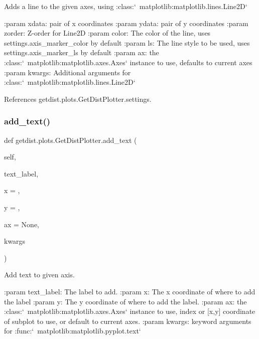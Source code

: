 \begin{DoxyVerb}Adds a line to the given axes, using :class:`~matplotlib:matplotlib.lines.Line2D`

:param xdata: pair of x coordinates
:param ydata: pair of y coordinates
:param zorder: Z-order for Line2D
:param color: The color of the line, uses settings.axis_marker_color by default
:param ls: The line style to be used, uses settings.axis_marker_ls by default
:param ax: the :class:`~matplotlib:matplotlib.axes.Axes` instance to use, defaults to current axes
:param kwargs:  Additional arguments for :class:`~matplotlib:matplotlib.lines.Line2D`
\end{DoxyVerb}
 

References getdist.\+plots.\+Get\+Dist\+Plotter.\+settings.

\mbox{\label{classgetdist_1_1plots_1_1GetDistPlotter_a3508bf76855c92e7e9129377b76ee390}} 
\subsubsection{\texorpdfstring{add\+\_\+text()}{add\_text()}}
{\footnotesize\ttfamily def getdist.\+plots.\+Get\+Dist\+Plotter.\+add\+\_\+text (\begin{DoxyParamCaption}\item[{}]{self,  }\item[{}]{text\+\_\+label,  }\item[{}]{x = {},  }\item[{}]{y = {},  }\item[{}]{ax = {\ttfamily None},  }\item[{}]{kwargs }\end{DoxyParamCaption})}

\begin{DoxyVerb}Add text to given axis.

:param text_label: The label to add.
:param x: The x coordinate of where to add the label
:param y: The y coordinate of where to add the label.
:param ax: the :class:`~matplotlib:matplotlib.axes.Axes` instance to use, 
   index or [x,y] coordinate of subplot to use, or default to current axes.
:param kwargs: keyword arguments for :func:`~matplotlib:matplotlib.pyplot.text` 
\end{DoxyVerb}
 

